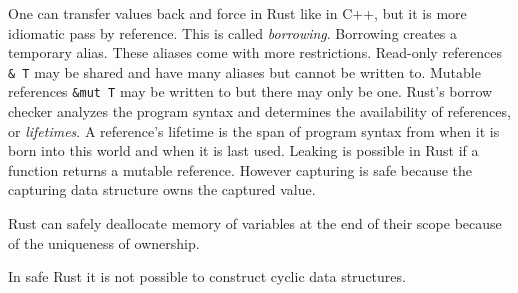\documentclass{article}
\begin{document}
One can transfer values back and force in Rust like in C++, but it is more idiomatic pass by reference.
This is called \textit{borrowing}.
Borrowing creates a temporary alias.
These aliases come with more restrictions.
Read-only references \texttt{\& T} may be shared and have many aliases but cannot be written to.
Mutable references \texttt{\&mut T} may be written to but there may only be one.
Rust's borrow checker analyzes the program syntax and determines the availability of references, or \textit{lifetimes}.
A reference's lifetime is the span of program syntax from when it is born into this world and when it is last used.
Leaking is possible in Rust if a function returns a mutable reference.
However capturing is safe because the capturing data structure owns the captured value.

\begin{remark}\label{remark:rustcoolmem}
  Rust can safely deallocate memory of variables at the end of their scope because of the uniqueness of ownership.
\end{remark}

\begin{remark}\label{remark:rusttree}
  In safe Rust it is not possible to construct cyclic data structures.
\end{remark}
\end{document}
